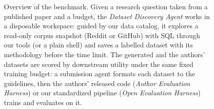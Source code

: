 \begin{figure}[t]
{%
}
\caption{Overview of the benchmark. Given a research question taken from a published paper and a budget, the
\emph{Dataset Discovery Agent} works in a disposable workspace: guided by our data catalog, it explores a read-only
corpus snapshot (Reddit or GitHub) with SQL through our tools (or a plain shell) and saves a labelled dataset with
its methodology before the time limit. The generated and the authors' datasets are scored by downstream utility under
the same fixed training budget: a submission agent formats each dataset to the guidelines, then the authors' released
code (\emph{Author Evaluation Harness}) or our standardized pipeline (\emph{Open Evaluation Harness}) trains and
evaluates on it.}
\label{fig:approach}
\end{figure}
